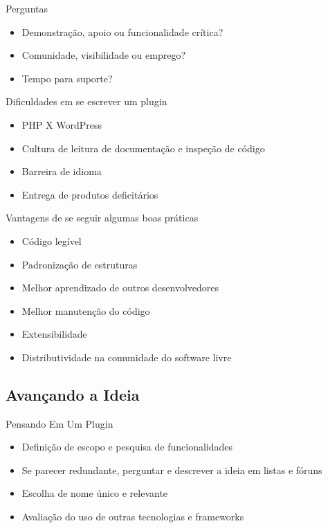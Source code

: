 \documentclass{beamer}
\begin{document}
\begin{frame}{Perguntas}
\begin{itemize}
  \pause \item Demonstração, apoio ou funcionalidade crítica?
  \pause \item Comunidade, visibilidade ou emprego?
  \pause \item Tempo para suporte?
\end{itemize}
\end{frame}

\begin{frame}{Dificuldades em se escrever um plugin}
\begin{itemize}
  \pause \item PHP X WordPress
  \pause \item Cultura de leitura de documentação e inspeção de código
  \pause \item Barreira de idioma
  \pause \item Entrega de produtos deficitários
\end{itemize}
\end{frame}

\begin{frame}{Vantagens de se seguir algumas boas práticas}
\begin{itemize}
  \pause \item Código legível
  \pause \item Padronização de estruturas
  \pause \item Melhor aprendizado de outros desenvolvedores
  \pause \item Melhor manutenção do código
  \pause \item Extensibilidade
  \pause \item Distributividade na comunidade do software livre
\end{itemize}
\end{frame}

\subsection{Avançando a Ideia}

\begin{frame}{Pensando Em Um Plugin}
\begin{itemize}
  \pause \item Definição de escopo e pesquisa de funcionalidades
  \pause \item Se parecer redundante, perguntar e descrever a
    ideia em listas e fóruns
  \pause \item Escolha de nome único e relevante
  \pause \item Avaliação do uso de outras tecnologias e frameworks
\end{itemize}
\end{frame}
\end{document}

